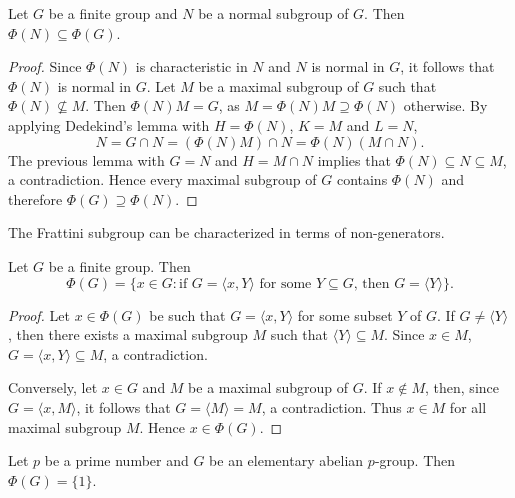 \begin{proposition}
	\label{pro:phi(N)phi(G)}
	Let $G$ be a finite group and $N$ be a normal subgroup of $G$. Then $\Phi(N)\subseteq\Phi(G)$.
\end{proposition}

\begin{proof}
	Since $\Phi(N)$ is characteristic in $N$ and $N$ is normal in $G$, it follows that 
	$\Phi(N)$
	is normal in $G$.  Let $M$ be a maximal subgroup of $G$ such that 
	$\Phi(N)\not\subseteq M$.  Then $\Phi(N)M=G$, as 
	$M=\Phi(N)M\supseteq\Phi(N)$ otherwise. By applying Dedekind's lemma with 
	$H=\Phi(N)$, $K=M$ and $L=N$,   
	\[
		N=G\cap N=(\Phi(N)M)\cap N=\Phi(N)(M\cap N).
	\]
	The previous lemma with $G=N$ and $H=M\cap N$ implies that $\Phi(N)\subseteq
	N\subseteq M$, a contradiction. Hence every maximal subgroup of $G$ 
	contains $\Phi(N)$ and therefore $\Phi(G)\supseteq\Phi(N)$. 
\end{proof}

The Frattini subgroup can be characterized in terms of non-generators.  

\begin{lemma}
	\label{lemma:nongenerators}
	Let $G$ be a finite group. Then 
	\[
	\Phi(G)=\{x\in G:\text{if $G=\langle x,Y\rangle$ for some $Y\subseteq G$, then $G=\langle Y\rangle$}\}.
	\]
\end{lemma}

\begin{proof}
	Let $x\in\Phi(G)$ be such that $G=\langle
	x,Y\rangle$ for some subset $Y$ of $G$. If $G\ne \langle Y\rangle$, then 
	there exists a maximal subgroup $M$ such that $\langle Y\rangle\subseteq M$. Since 
	$x\in M$, $G=\langle x,Y\rangle\subseteq M$, a contradiction.
	
	Conversely, 
	let $x\in G$ and $M$ be a maximal subgroup of $G$. If $x\not\in M$, then, since $G=\langle
	x,M\rangle$, it follows that $G=\langle M\rangle=M$, a contradiction. Thus $x\in M$ for all
	maximal subgroup $M$. Hence $x\in \Phi(G)$. 
\end{proof}

\begin{exercise}
	Let $p$ be a prime number and $G$ be an elementary abelian $p$-group. Then 
	$\Phi(G)=\{1\}$.
\end{exercise}

